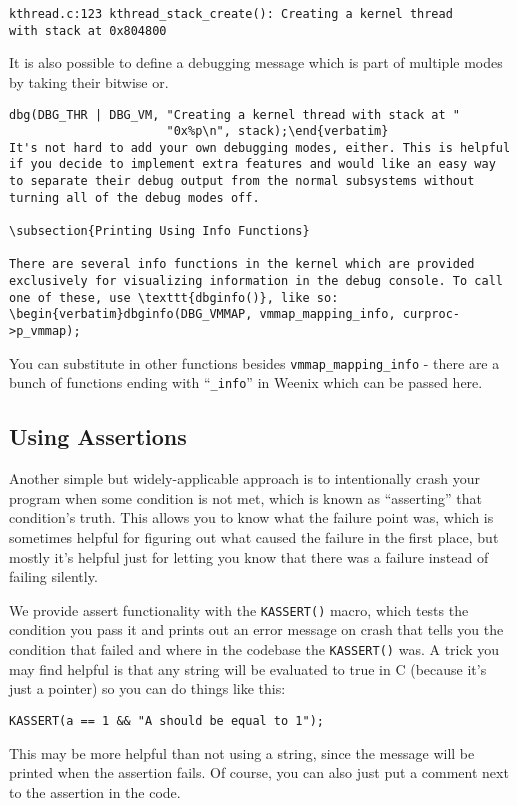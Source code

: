 \begin{verbatim}
kthread.c:123 kthread_stack_create(): Creating a kernel thread
with stack at 0x804800\end{verbatim}
It is also possible to define a debugging message which is part of multiple modes by taking their bitwise or.
\begin{verbatim}
dbg(DBG_THR | DBG_VM, "Creating a kernel thread with stack at "
                      "0x%p\n", stack);\end{verbatim}
It's not hard to add your own debugging modes, either. This is helpful if you decide to implement extra features and would like an easy way to separate their debug output from the normal subsystems without turning all of the debug modes off.

\subsection{Printing Using Info Functions}

There are several info functions in the kernel which are provided exclusively for visualizing information in the debug console. To call one of these, use \texttt{dbginfo()}, like so:
\begin{verbatim}dbginfo(DBG_VMMAP, vmmap_mapping_info, curproc->p_vmmap);\end{verbatim}
You can substitute in other functions besides \texttt{vmmap\_mapping\_info} - there are a bunch of functions ending with ``\texttt{\_info}'' in Weenix which can be passed here.

\subsection{Using Assertions}

Another simple but widely-applicable approach is to intentionally crash your program when some condition is not met, which is known as ``asserting'' that condition's truth. This allows you to know what the failure point was, which is sometimes helpful for figuring out what caused the failure in the first place, but mostly it's helpful just for letting you know that there was a failure instead of failing silently.

We provide assert functionality with the \texttt{KASSERT()} macro, which tests the condition you pass it and prints out an error message on crash that tells you the condition that failed and where in the codebase the \texttt{KASSERT()} was. A trick you may find helpful is that any string will be evaluated to true in C (because it's just a pointer) so you can do things like this:
\begin{verbatim}
KASSERT(a == 1 && "A should be equal to 1");\end{verbatim}
This may be more helpful than not using a string, since the message will be printed when the assertion fails. Of course, you can also just put a comment next to the assertion in the code.

